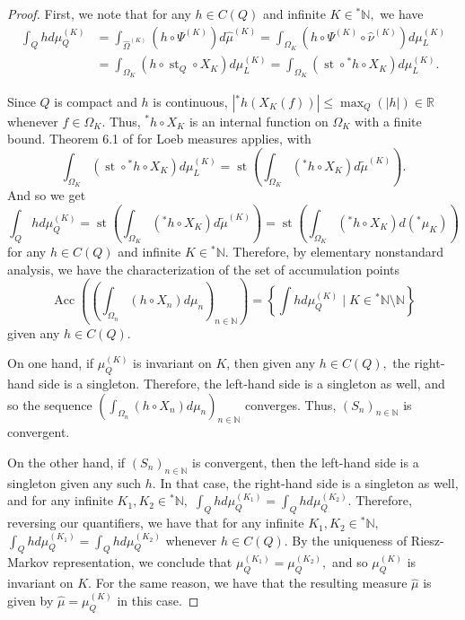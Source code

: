 \documentclass[10pt,a4paper]{amsart}
\def \St{\operatorname{st}}
\def \HOM{\hat{\Omega}}
\def \HMU{\hat{\mu}}
\def \HNU{\hat{\nu}}
\begin{document}
\begin{proof}
	First, we note that for any $h\in C(Q)$ and  infinite $K\in{}^*\mathbb{N},$ we have 
	\begin{align*}
		\int_Q hd\mu_Q^{(K)}&=\int_{\HOM^{(K)}}(h\circ \Psi^{(K)})d\HMU^{(K)}=\int_{\Omega_K}(h\circ \Psi^{(K)}\circ \HNU^{(K)})d\mu_L^{(K)}\\
		&=\int_{\Omega_K}(h\circ \St_Q\circ X_K)d\mu_L^{(K)}=\int_{\Omega_K}(\St\circ {}^*h\circ X_K)d\mu_L^{(K)}.
	\end{align*}
	
	Since $Q$ is compact and $h$ is continuous, $|{}^*h(X_K(f))|\leq \max_Q(|h|)\in\mathbb{R}$ whenever $f\in\Omega_K.$ Thus, ${}^*h\circ X_K$ is an internal function on $\Omega_K$ with a finite bound. Theorem 6.1 of \cite{Ross1997} for Loeb measures applies, with $$\int_{\Omega_K}(\St\circ {}^*h\circ X_K)d\mu_L^{(K)}=\St\left(\int_{\Omega_K}({}^*h\circ X_K)d\tilde{\mu}^{(K)}\right).$$ And so we get $$\int_Q hd\mu_Q^{(K)}=\St\left(\int_{\Omega_K}({}^*h\circ X_K)d\tilde{\mu}^{(K)}\right)=\St\left(\int_{\Omega_K}({}^*h\circ X_K)d({}^*\mu_K)\right) $$ for any $h\in C(Q)$ and infinite $K\in{}^*\mathbb{N}.$ Therefore, by elementary nonstandard analysis, we have the characterization of the set of accumulation points $$\operatorname{Acc}\left(\left(\int_{\Omega_n}(h\circ X_n)d\mu_n\right)_{n\in\mathbb{N}}\right)=\left\{\int hd\mu_Q^{(K)}\;|\; K\in{}^*\mathbb{N}\setminus\mathbb{N} \right\}$$ given any $h\in C(Q).$ 
	
	On one hand, if $\mu_Q^{(K)}$ is invariant on $K$, then given any $h\in C(Q),$ the right-hand side is a singleton. Therefore, the left-hand side is a singleton as well, and so the sequence $\left(\int_{\Omega_n}(h\circ X_n)d\mu_n\right)_{n\in\mathbb{N}}$ converges. Thus, $(S_n)_{n\in\mathbb{N}}$ is convergent.
	
	On the other hand, if $(S_n)_{n\in\mathbb{N}}$ is convergent, then the left-hand side is a singleton given any such $h$. In that case, the right-hand side is a singleton as well, and for any infinite $K_1, K_2\in{}^*\mathbb{N},$ $\int_Qhd\mu_Q^{(K_1)}=\int_Qhd\mu_Q^{(K_2)}$. Therefore, reversing our quantifiers, we have that for any infinite $K_1, K_2\in{}^*\mathbb{N},$ $\int_Qhd\mu_Q^{(K_1)}=\int_Qhd\mu_Q^{(K_2)}$ whenever $h\in C(Q).$ By the uniqueness of Riesz-Markov representation, we conclude that $\mu_Q^{(K_1)}=\mu_Q^{(K_2)},$ and so $\mu_Q^{(K)}$ is invariant on $K$. For the same reason, we have that the resulting measure $\HMU$ is given by $\HMU=\mu_Q^{(K)}$ in this case. 
	

\end{proof}
\end{document}
